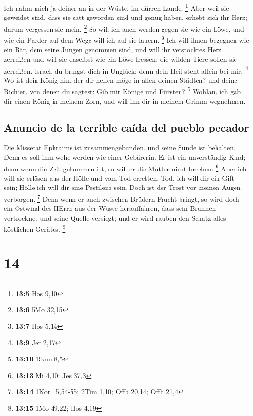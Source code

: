  Ich nahm mich ja deiner an in der Wüste, im dürren Lande.
\footnote{\textbf{13:5} Hos 9,10}  Aber weil sie geweidet
sind, dass sie satt geworden sind und genug haben, erhebt sich ihr Herz;
darum vergessen sie mein. \footnote{\textbf{13:6} 5Mo 32,15}
 So will ich auch werden gegen sie wie ein Löwe, und wie
ein Parder auf dem Wege will ich auf sie lauern. \footnote{\textbf{13:7}
  Hos 5,14}  Ich will ihnen begegnen wie ein Bär, dem
seine Jungen genommen sind, und will ihr verstocktes Herz zerreißen und
will sie daselbst wie ein Löwe fressen; die wilden Tiere sollen sie
zerreißen.  Israel, du bringst dich in Unglück; denn dein
Heil steht allein bei mir. \footnote{\textbf{13:9} Jer 2,17}
 Wo ist dein König hin, der dir helfen möge in allen
deinen Städten? und deine Richter, von denen du sagtest: Gib mir Könige
und Fürsten? \footnote{\textbf{13:10} 1Sam 8,5}  Wohlan,
ich gab dir einen König in meinem Zorn, und will ihn dir in meinem Grimm
wegnehmen.

\hypertarget{anuncio-de-la-terrible-cauxedda-del-pueblo-pecador}{%
\subsection{Anuncio de la terrible caída del pueblo
pecador}\label{anuncio-de-la-terrible-cauxedda-del-pueblo-pecador}}

 Die Missetat Ephraims ist zusammengebunden, und seine
Sünde ist behalten.  Denn es soll ihm wehe werden wie
einer Gebärerin. Er ist ein unverständig Kind; denn wenn die Zeit
gekommen ist, so will er die Mutter nicht brechen. \footnote{\textbf{13:13}
  Mi 4,10; Jes 37,3}  Aber ich will sie erlösen aus der
Hölle und vom Tod erretten. Tod, ich will dir ein Gift sein; Hölle ich
will dir eine Pestilenz sein. Doch ist der Trost vor meinen Augen
verborgen. \footnote{\textbf{13:14} 1Kor 15,54-55; 2Tim 1,10; Offb
  20,14; Offb 21,4}  Denn wenn er auch zwischen Brüdern
Frucht bringt, so wird doch ein Ostwind des HErrn aus der Wüste
herauffahren, dass sein Brunnen vertrocknet und seine Quelle versiegt;
und er wird rauben den Schatz alles köstlichen Gerätes. \footnote{\textbf{13:15}
  1Mo 49,22; Hos 4,19}

\hypertarget{section-13}{%
\section{14}\label{section-13}}


